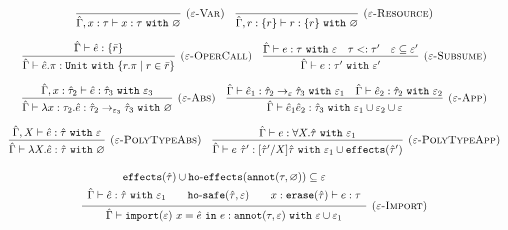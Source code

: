 \documentclass{llncs}
\newcommand{\keywadj}[1]{\mathtt{#1}}
\newcommand{\keyw}[1]{\keywadj{#1}~}
\newcommand{\kw}[1]{\keyw{ #1 }}
\newcommand{\kwa}[1]{\keywadj{ #1 }}
\newcommand{\hyphen}{\hbox{-}}
\newcommand{\fx}[1]{ \kwa{effects}(#1) }
\newcommand{\hofx}[1]{ \kwa{ho \hyphen effects}(#1) }
\newcommand{\annot}[2]{
	\keywadj{annot}(#1, #2)
}
\begin{document}
\[
\begin{array}{c}

\infer[\textsc{($\varepsilon$-Var)}]
	{ \hat \Gamma, x:\tau \vdash x: \tau~\kw{with} \varnothing }
	{}
~~~
\infer[\textsc{($\varepsilon$-Resource)}]
 	{ \hat \Gamma, r: \{ r \} \vdash r : \{ r \}~\kw{with} \varnothing }
 	{}\\[2ex]
 	


\infer[\textsc{($\varepsilon$-OperCall)}]
	{ \hat \Gamma \vdash \hat e.\pi: \kw{Unit} \kw{with} \{ r.\pi \mid r \in \bar r \} }
	{ \hat \Gamma \vdash \hat e: \{ \bar r \}}
	~~~

\infer[\textsc{($\varepsilon$-Subsume)}]
	{\hat \Gamma \vdash e: \tau' ~\kw{with} \varepsilon'}
	{\hat \Gamma \vdash e: \tau ~\kw{with} \varepsilon & \tau <: \tau' & \varepsilon \subseteq \varepsilon'}\\[2ex]

	\infer[\textsc{($\varepsilon$-Abs)}]
	{ \hat \Gamma \vdash \lambda x:\tau_2 . \hat e : \hat \tau_2 \rightarrow_{\varepsilon_3} \hat \tau_3~\kw{with} \varnothing }
	{ \hat \Gamma, x: \hat \tau_2 \vdash \hat e: \hat \tau_3~\kw{with} \varepsilon_3 }
	~~~
\infer[\textsc{($\varepsilon$-App)}]
	{ \hat \Gamma \vdash \hat e_1 \hat e_2 : \hat \tau_3~\kw{with} \varepsilon_1 \cup \varepsilon_2 \cup \varepsilon  }
	{ \hat \Gamma \vdash \hat e_1: \hat \tau_2 \rightarrow_{\varepsilon} \hat \tau_3~\kw{with} \varepsilon_1 & \hat \Gamma \vdash \hat e_2: \hat \tau_2~\kw{with} \varepsilon_2 } \\[2ex]

\infer[\textsc{($\varepsilon$-PolyTypeAbs)}]
	{ \hat \Gamma \vdash \lambda X. \hat e : \hat \tau ~\kw{with} \varnothing }
	{ \hat \Gamma, X \vdash \hat e: \hat \tau ~\kw{with} \varepsilon }

~~~

\infer[\textsc{($\varepsilon$-PolyTypeApp)}]
	{ \hat \Gamma \vdash e~\hat \tau' : [\hat \tau'/X]\hat \tau~\kw{with} \varepsilon_1 \cup \fx{\hat \tau'} }
	{ \hat \Gamma \vdash e : \forall X.\hat \tau~\kw{with} \varepsilon_1 } \\[2ex]

\infer[\textsc{($\varepsilon$-Import)}]
	{ \hat \Gamma \vdash \kwa{import}(\varepsilon)~x = \hat e~\kw{in} e: \kwa{annot}(\tau, \varepsilon)~\kw{with} \varepsilon \cup \varepsilon_1 }
{{\def\arraystretch{1.4}
  \begin{array}{c}
\kwa{effects}(\hat \tau) \cup \hofx{\annot{\tau}{\varnothing}}\subseteq \varepsilon \\
\hat \Gamma \vdash \hat e: \hat \tau~\kw{with} \varepsilon_1 ~~~~~~ \kwa{ho \hyphen safe}(\hat \tau, \varepsilon) ~~~~~~ x: \kwa{erase}(\hat \tau) \vdash e: \tau
  \end{array}}} 
 
 
\end{array}
\]
\end{document}
